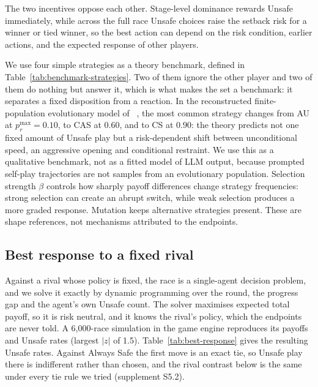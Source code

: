 \documentclass{article}
\DeclareRobustCommand{\citet}[1]{\citeauthor{#1}~\shortcite{#1}}
\begin{document}
The two incentives oppose each other. Stage-level dominance rewards Unsafe
immediately, while across the full race Unsafe choices raise the setback risk
for a winner or tied winner, so the best action can depend on the risk
condition, earlier actions, and the expected response of other players.

We use four simple strategies as a theory benchmark, defined in
Table~\ref{tab:benchmark-strategies}. Two of them ignore the other player and
two of them do nothing but answer it, which is what makes the set a benchmark:
it separates a fixed disposition from a reaction. In the reconstructed finite-population evolutionary model of
\citet{falling_behind_unsafe}, the most common strategy changes from AU at
$p_r^{\max}=0.10$, to CAS at $0.60$, and to CS at $0.90$: the theory predicts
not one fixed amount of Unsafe play but a risk-dependent shift between
unconditional speed, an aggressive opening and conditional restraint. We use
this as a qualitative benchmark, not as a fitted model of LLM output, because
prompted self-play trajectories are not samples from an evolutionary
population.
Selection strength $\beta$ controls how sharply payoff differences change
strategy frequencies: strong selection can create an abrupt switch, while weak
selection produces a more graded response. Mutation keeps alternative strategies
present. These are shape references, not mechanisms attributed to the endpoints.

\subsection{Best response to a fixed rival}
\label{sec:best-response}

Against a rival whose policy is fixed, the race is a single-agent decision
problem, and we solve it exactly by dynamic programming over the round, the
progress gap and the agent's own Unsafe count. The solver maximises expected
total payoff, so it is risk neutral, and it knows the rival's policy, which the
endpoints are never told. A 6{,}000-race simulation in the game engine
reproduces its payoffs and Unsafe rates (largest $|z|$ of 1.5).
Table~\ref{tab:best-response} gives the resulting Unsafe rates. Against
Always Safe the first move is an exact tie, so Unsafe play there is indifferent
rather than chosen, and the rival contrast below is the same under every tie
rule we tried (supplement S5.2).
\end{document}
